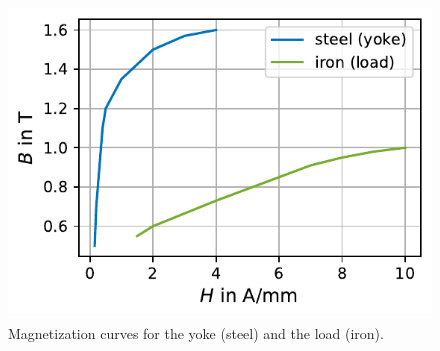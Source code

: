 \begin{figure}[h!]
    \centering
    \includegraphics{fig/magCurve.pdf}
    \caption{Magnetization curves for the yoke (steel) and the load (iron).}
    \label{fig:magCurve}
\end{figure}



